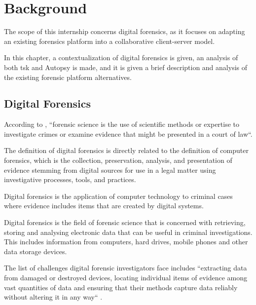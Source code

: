 
\chapter{Background}
\label{ch:background}

The scope of this internship concerns digital forensics, as it focuses on adapting an existing forensics platform into a collaborative client-server model.

In this chapter, a contextualization of digital forensics is given, an analysis of both \acrfull{tsk} \cite{sleuthkit} and Autopsy \cite{autopsy} is made, 
and it is given a brief description and analysis of the existing forensic platform alternatives.

\section{Digital Forensics}

According to \citeauthor{nist} \cite{nist}, ``forensic science is the use of scientific methods or expertise to investigate crimes
or examine evidence that might be presented in a court of law``.

The definition of digital forensics is directly related to the definition of
computer forensics, which is the collection, preservation, analysis,
and presentation \cite{daniels} of evidence stemming from digital sources for use in a legal matter
using investigative processes, tools, and practices.

Digital forensics \cite{nist2} is the application of computer technology to criminal cases where evidence
includes items that are created by digital systems.

Digital forensics is the field of forensic science that is concerned with retrieving,
storing and analysing electronic data that can be useful in criminal investigations.
This includes information from computers, hard drives, mobile phones and other data
storage devices.

The list of challenges digital forensic investigators face includes ``extracting data from damaged or destroyed
devices, locating individual items of evidence among vast quantities of data
and ensuring that their methods capture data reliably without altering it in any way`` \cite{nist2}.

